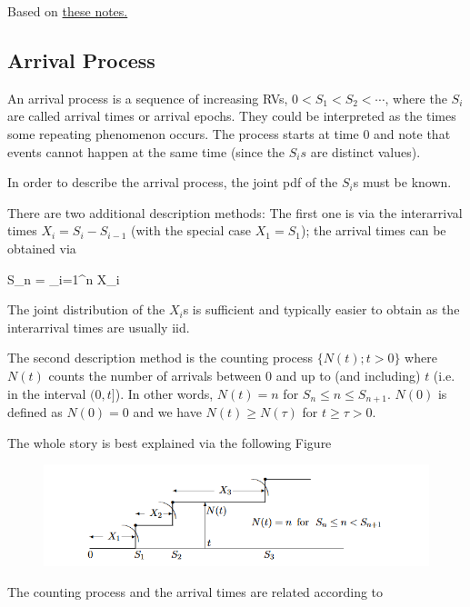 
Based on \href{https://ocw.mit.edu/courses/electrical-engineering-and-computer-science/6-262-discrete-stochastic-processes-spring-2011/course-notes/MIT6_262S11_chap02.pdf}{these notes.}

\subsection{Arrival Process}

An arrival process is a sequence of increasing RVs, $0 < S_1 < S_2 < \cdots$, where the $S_i$ are called arrival times or arrival epochs. They could be interpreted as the times some repeating phenomenon occurs. The process starts at time $0$ and note that events cannot happen at the same time (since the $S_is$ are distinct values).

In order to describe the arrival process, the joint pdf of the $S_i$s must be known.

There are two additional description methods: The first one is via the interarrival times $X_i = S_i - S_{i-1}$ (with the special case $X_1 = S_1$); the arrival times can be obtained via

\bee
S_n = \sum_{i=1}^n X_i
\eee

The joint distribution of the $X_i$s is sufficient and typically easier to obtain as the interarrival times are usually iid.

The second description method is the counting process $\{N(t); t>0\}$ where $N(t)$ counts the number of arrivals between $0$ and up to (and including) $t$ (i.e. in the interval $(0,t]$). In other words, $N(t) = n$ for $S_n \leq n \leq S_{n+1}$. $N(0)$ is defined as $N(0) = 0$ and we have $N(t) \geq N(\tau)$ for $t \geq \tau > 0$.

The whole story is best explained via the following Figure

\begin{figure}[H]
  \includegraphics[scale=0.8]{images/poisson_process_1_1.png}
\end{figure}

The counting process and the arrival times are related according to

